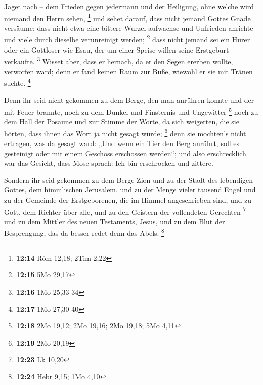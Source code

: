  Jaget nach -- dem Frieden gegen jedermann und der
Heiligung, ohne welche wird niemand den Herrn sehen, \footnote{\textbf{12:14}
  Röm 12,18; 2Tim 2,22}  und sehet darauf, dass nicht
jemand Gottes Gnade versäume; dass nicht etwa eine bittere Wurzel
aufwachse und Unfrieden anrichte und viele durch dieselbe verunreinigt
werden; \footnote{\textbf{12:15} 5Mo 29,17}  dass nicht
jemand sei ein Hurer oder ein Gottloser wie Esau, der um einer Speise
willen seine Erstgeburt verkaufte. \footnote{\textbf{12:16} 1Mo 25,33-34}
 Wisset aber, dass er hernach, da er den Segen ererben
wollte, verworfen ward; denn er fand keinen Raum zur Buße, wiewohl er
sie mit Tränen suchte. \footnote{\textbf{12:17} 1Mo 27,30-40}

 Denn ihr seid nicht gekommen zu dem Berge, den man
anrühren konnte und der mit Feuer brannte, noch zu dem Dunkel und
Finsternis und Ungewitter \footnote{\textbf{12:18} 2Mo 19,12; 2Mo 19,16;
  2Mo 19,18; 5Mo 4,11}  noch zu dem Hall der Posaune und
zur Stimme der Worte, da sich weigerten, die sie hörten, dass ihnen das
Wort ja nicht gesagt würde; \footnote{\textbf{12:19} 2Mo 20,19}
 denn sie mochten's nicht ertragen, was da gesagt ward:
„Und wenn ein Tier den Berg anrührt, soll es gesteinigt oder mit einem
Geschoss erschossen werden``;  und also erschrecklich war
das Gesicht, dass Mose sprach: Ich bin erschrocken und zittere.

 Sondern ihr seid gekommen zu dem Berge Zion und zu der
Stadt des lebendigen Gottes, dem himmlischen Jerusalem, und zu der Menge
vieler tausend Engel  und zu der Gemeinde der
Erstgeborenen, die im Himmel angeschrieben sind, und zu Gott, dem
Richter über alle, und zu den Geistern der vollendeten Gerechten
\footnote{\textbf{12:23} Lk 10,20}  und zu dem Mittler
des neuen Testaments, Jesus, und zu dem Blut der Besprengung, das da
besser redet denn das Abels. \footnote{\textbf{12:24} Hebr 9,15; 1Mo
  4,10}

